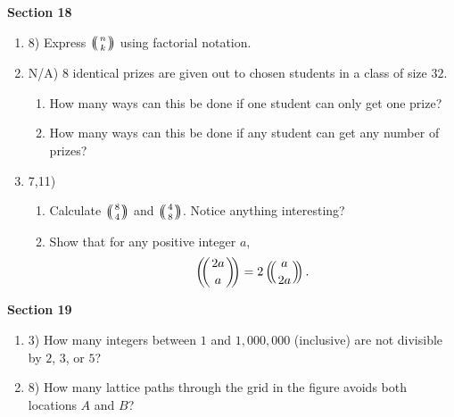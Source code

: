 \documentclass[11pt]{preprint}
\def\enumb{\begin{enumerate}}
\def\enume{\end{enumerate}}
\def\multiset#1#2{\ensuremath{\left(\kern-.3em\left(\genfrac{}{}{0pt}{}{#1}{#2}\right)\kern-.3em\right)}}
\begin{document}
\textbf{Section 18}
\enumb
\item[8)] Express $\multiset{n}{k}$ using factorial notation.
\item[N/A)] $8$ identical prizes are given out to chosen students in a class of size $32$.
\enumb
\item How many ways can this be done if one student can only get one prize?
\item How many ways can this be done if any student can get any number of prizes?
\enume 
\item[7,11)]
\enumb
\item Calculate $\multiset{8}{4}$ and $\multiset{4}{8}$. Notice anything interesting?
\item Show that for any positive integer $a$, 
\[
\multiset{2a}{a}=2\multiset{a}{2a}.
\]
\enume
\enume

\textbf{Section 19}

\enumb
\item[3)] How many integers between $1$ and $1,000,000$ (inclusive) are not divisible by $2$, $3$, or $5$?
\item[8)] How many lattice paths through the grid in the figure avoids both locations $A$ and $B$?
\begin{figure}[h]
\centering
{}
\end{figure}
\enume
\end{document}
